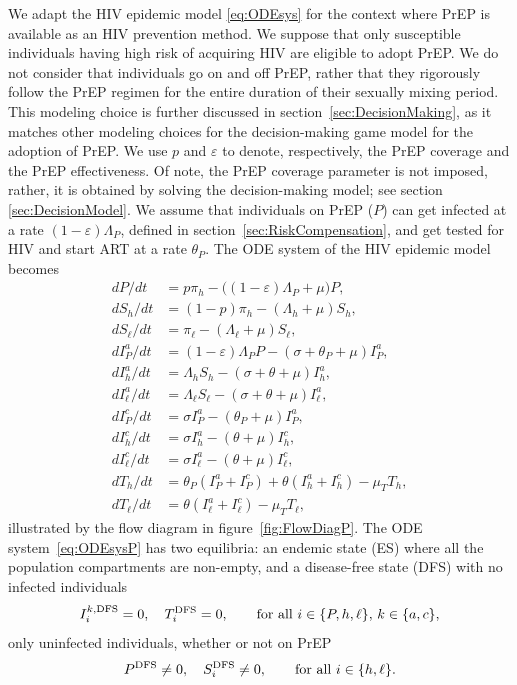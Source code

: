 \documentclass[12pt]{article}
\begin{document}
We adapt the HIV epidemic model \eqref{eq:ODEsys} for the context where PrEP is available as an HIV prevention method. We suppose that only susceptible individuals having high risk of acquiring HIV are eligible to adopt PrEP. We do not consider that individuals go on and off PrEP, rather that they rigorously follow the PrEP regimen for the entire duration of their sexually mixing period. This modeling choice is further discussed in section~\ref{sec:DecisionMaking}, as it matches other modeling choices for the decision-making game model for the adoption of PrEP. We use $p$ and $\varepsilon$ to denote, respectively, the PrEP coverage and the PrEP effectiveness. Of note, the PrEP coverage parameter is not imposed, rather, it is obtained by solving the decision-making model; see section \ref{sec:DecisionModel}. We assume that individuals on PrEP ($P$) can get infected at a rate $(1-\varepsilon)\Lambda_P$, defined in section~\ref{sec:RiskCompensation}, and get tested {for HIV and start ART} at a rate $\theta_P$. The ODE system of the HIV epidemic model becomes
\begin{equation} \label{eq:ODEsysP} 
\begin{aligned}
        dP/dt 		& = p \pi_h - \Big( (1-\varepsilon) \Lambda_P + \mu \Big) P, \\
        dS_h/dt 		& = (1-p) \pi_h - \left( \Lambda_h + \mu \right) S_h, \\ 
        dS_\ell/dt 		& = \pi_\ell - \left( \Lambda_\ell + \mu \right) S_\ell, \\ 
        dI_P^a/dt		& = (1-\varepsilon) \Lambda_P P - \left(\sigma + \theta_P + \mu \right) I_P^a, \\
        dI_h^a/dt 		& = \Lambda_h S_h - \left( \sigma + \theta + \mu \right) I_h^a, \\
        dI_\ell^a/dt 	& = \Lambda_\ell S_\ell - \left( \sigma + \theta + \mu \right) I_\ell^a, \\
        dI_P^c/dt 		& = \sigma I_P^a - \left( \theta_P + \mu \right) I_P^a,\\
        dI_h^c/dt 		& = \sigma I_h^a - (\theta +\mu) I_h^c, \\
        dI_\ell^c/dt 	& = \sigma I_\ell^a - (\theta +\mu) I_\ell^c, \\
        dT_h/dt 		& = \theta_P \left( I_P^a + I_P^c\right) + \theta \left(I_h^a + I_h^c \right) - \mu_T T_h, \\
        dT_\ell/dt 		& = \theta \left(I_\ell^a + I_\ell^c\right) - \mu_T T_\ell,
\end{aligned}
\end{equation}
illustrated by the flow diagram in figure~\ref{fig:FlowDiagP}. The ODE system~\eqref{eq:ODEsysP} has two equilibria: an endemic state (ES) where all the population compartments are non-empty, and a disease-free state (DFS) with no infected individuals
\begin{equation}
	I_i^{k,\rm DFS} = 0,\quad T_i^{\rm DFS} = 0, \qquad \text{for all } i\in\{P,h,\ell\}, \, k\in\{a,c\},
\end{equation}
only uninfected individuals, whether or not on PrEP
\begin{equation}
	P^{\rm DFS}\neq 0,\quad S_i^{\rm DFS}\neq 0, \qquad \text{for all } i\in\{h,\ell\}.
\end{equation}
\end{document}
